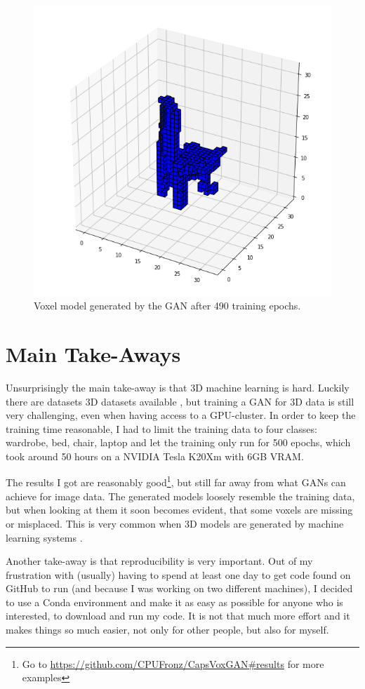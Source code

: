 \documentclass[11pt]{article}
\begin{document}
\begin{figure}
	\centering
	\includegraphics[width=0.7\linewidth]{../plots/epoch0490}
	\caption{Voxel model generated by the GAN after 490 training epochs.}
	\label{fig:voxel_example}
\end{figure}


\section{Main Take-Aways}
\label{sec:take-away}
Unsurprisingly the main take-away is that 3D machine learning is hard. Luckily there are datasets 3D datasets available \cite{wu2015}, but training a GAN for 3D data is still very challenging, even when having access to a GPU-cluster. In order to keep the training time reasonable, I had to limit the training data to four classes: wardrobe, bed, chair, laptop and let the training only run for 500 epochs, which took around 50 hours on a NVIDIA Tesla K20Xm with 6GB VRAM.

The results I got are reasonably good\footnote{Go to \url{https://github.com/CPUFronz/CapsVoxGAN\#results} for more examples}, but still far away from what GANs can achieve for image data. The generated models loosely resemble the training data, but when looking at them it soon becomes evident, that some voxels are missing or misplaced. This is very common when 3D models are generated by machine learning systems \cite{zhao2019b, wu2016}.

Another take-away is that reproducibility is very important. Out of my frustration with (usually) having to spend at least one day to get code found on GitHub to run (and because I was working on two different machines), I decided to use a Conda environment and make it as easy as possible for anyone who is interested, to download and run my code. It is not that much more effort and it makes things so much easier, not only for other people, but also for myself.
\end{document}
